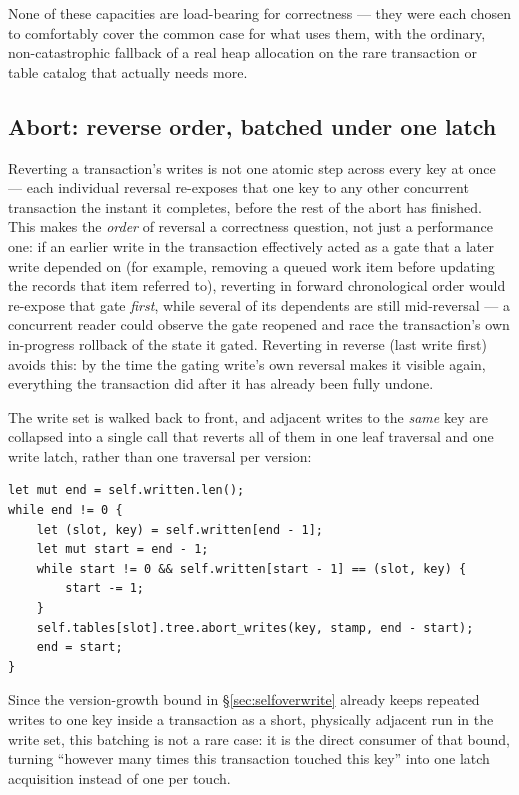\documentclass[11pt]{article}
\begin{document}
None of these capacities are load-bearing for correctness --- they were each chosen
to comfortably cover the common case for what uses them, with the ordinary,
non-catastrophic fallback of a real heap allocation on the rare transaction or
table catalog that actually needs more.

\subsection{Abort: reverse order, batched under one latch}
\label{sec:abort}

Reverting a transaction's writes is not one atomic step across every key at once ---
each individual reversal re-exposes that one key to any other concurrent transaction
the instant it completes, before the rest of the abort has finished. This makes the
\emph{order} of reversal a correctness question, not just a performance one:
if an earlier write in the transaction effectively acted as a gate that a later
write depended on (for example, removing a queued work item before updating the
records that item referred to), reverting in forward chronological order would
re-expose that gate \emph{first}, while several of its dependents are still
mid-reversal --- a concurrent reader could observe the gate reopened and race the
transaction's own in-progress rollback of the state it gated. Reverting in reverse
(last write first) avoids this: by the time the gating write's own reversal makes it
visible again, everything the transaction did after it has already been fully
undone.

The write set is walked back to front, and adjacent writes to the \emph{same} key
are collapsed into a single call that reverts all of them in one leaf traversal and
one write latch, rather than one traversal per version:

\begin{lstlisting}
let mut end = self.written.len();
while end != 0 {
    let (slot, key) = self.written[end - 1];
    let mut start = end - 1;
    while start != 0 && self.written[start - 1] == (slot, key) {
        start -= 1;
    }
    self.tables[slot].tree.abort_writes(key, stamp, end - start);
    end = start;
}
\end{lstlisting}

Since the version-growth bound in \S\ref{sec:selfoverwrite} already keeps repeated
writes to one key inside a transaction as a short, physically adjacent run in the
write set, this batching is not a rare case: it is the direct consumer of that
bound, turning ``however many times this transaction touched this key'' into one
latch acquisition instead of one per touch.
\end{document}
